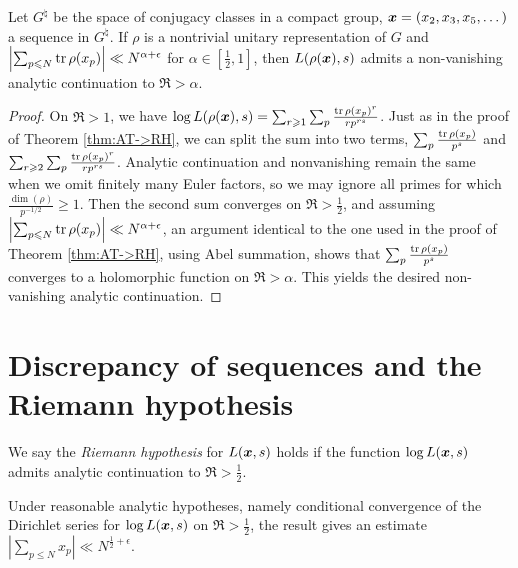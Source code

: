 \begin{theorem}\label{thm:AT->RH:gp}
Let $G^\natural$ be the space of conjugacy classes in a compact group, 
${\boldsymbol x} = (x_2,x_3,x_5,\dots)$ a sequence in $G^\natural$. If $\rho$ is a 
nontrivial unitary representation of $G$ and 
$\left| \sum_{p\leqslant N} \operatorname{tr} \rho(x_p)\right| \ll N^{\alpha+\epsilon}$ for 
$\alpha\in \left[\frac 1 2,1\right]$, then $L(\rho({\boldsymbol x}),s)$ admits a 
non-vanishing analytic continuation to $\Re > \alpha$. 
\end{theorem}
\begin{proof}
On $\Re > 1$, we have 
$\log L(\rho({\boldsymbol x}),s) = \sum_{r\geqslant 1} \sum_p \frac{\operatorname{tr} \rho(x_p)^r}{r p^{r s}}$. 
Just as in the proof of Theorem \ref{thm:AT->RH}, we can split the sum into 
two terms, $\sum_p \frac{\operatorname{tr} \rho(x_p)}{p^s}$ and 
$\sum_{r\geqslant 2} \sum_p \frac{\operatorname{tr} \rho(x_p)^r}{r p^{r s}}$. Analytic 
continuation and nonvanishing remain the same when we omit finitely many Euler 
factors, so we may ignore all primes for which 
$\frac{\dim(\rho)}{p^{-1/2}} \geqslant 1$. Then the second sum converges on 
$\Re > \frac 1 2$, and assuming 
$\left| \sum_{p\leqslant N} \operatorname{tr} \rho(x_p)\right| \ll N^{\alpha+\epsilon}$, an 
argument identical to the one used in the proof of Theorem \ref{thm:AT->RH}, 
using Abel summation, shows that 
$\sum_p \frac{\operatorname{tr} \rho(x_p)}{p^s}$ converges to a holomorphic function on 
$\Re > \alpha$. This yields the desired non-vanishing analytic continuation. 
\end{proof}





\section{Discrepancy of sequences and the Riemann hypothesis}

\begin{definition}
We say the \emph{Riemann hypothesis} for $L({\boldsymbol x},s)$ holds if the function 
$\log L({\boldsymbol x},s)$ admits analytic continuation to $\Re > \frac 1 2$. 
\end{definition}

Under reasonable analytic hypotheses, namely conditional convergence of 
the Dirichlet series for 
$\log L({\boldsymbol x},s)$ on $\Re > \frac 1 2$, the result 
\cite[II.1 Th.~10]{tenenbaum-1995} gives 
an estimate $|\sum_{p\leqslant N} x_p| \ll N^{\frac 1 2 + \epsilon}$. 

